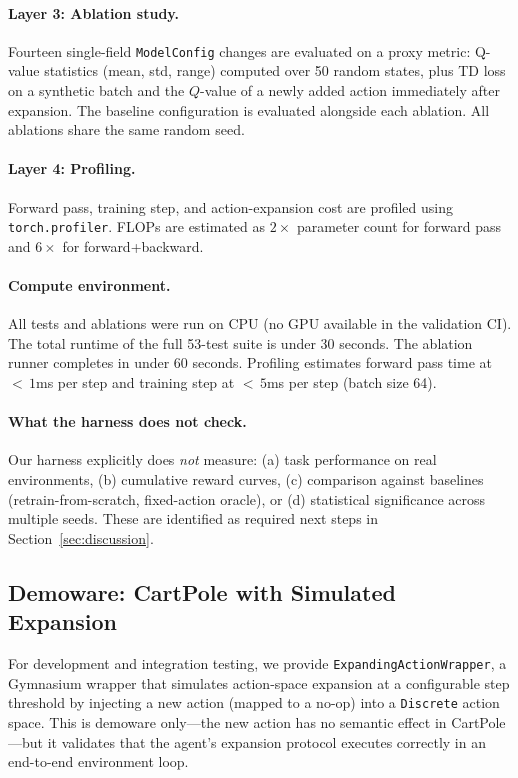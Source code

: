\documentclass{article}
\begin{document}
\paragraph{Layer 3: Ablation study.} Fourteen single-field \texttt{ModelConfig} changes are evaluated on a proxy metric: Q-value statistics (mean, std, range) computed over 50 random states, plus TD loss on a synthetic batch and the $Q$-value of a newly added action immediately after expansion. The baseline configuration is evaluated alongside each ablation. All ablations share the same random seed.

\paragraph{Layer 4: Profiling.} Forward pass, training step, and action-expansion cost are profiled using \texttt{torch.profiler}. FLOPs are estimated as $2\times$ parameter count for forward pass and $6\times$ for forward+backward.

\paragraph{Compute environment.} All tests and ablations were run on CPU (no GPU available in the validation CI). The total runtime of the full 53-test suite is under 30 seconds. The ablation runner completes in under 60 seconds. Profiling estimates forward pass time at ${<}\,1$ms per step and training step at ${<}\,5$ms per step (batch size 64).

\paragraph{What the harness does not check.} Our harness explicitly does \emph{not} measure: (a) task performance on real environments, (b) cumulative reward curves, (c) comparison against baselines (retrain-from-scratch, fixed-action oracle), or (d) statistical significance across multiple seeds. These are identified as required next steps in Section~\ref{sec:discussion}.

\subsection{Demoware: CartPole with Simulated Expansion}

For development and integration testing, we provide \texttt{ExpandingActionWrapper}, a Gymnasium wrapper that simulates action-space expansion at a configurable step threshold by injecting a new action (mapped to a no-op) into a \texttt{Discrete} action space. This is demoware only---the new action has no semantic effect in CartPole---but it validates that the agent's expansion protocol executes correctly in an end-to-end environment loop.
\end{document}
